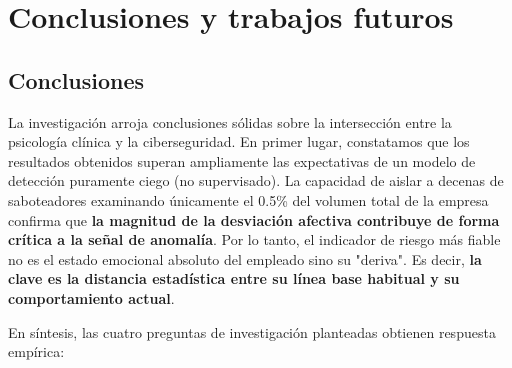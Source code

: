 \documentclass[IB]{TFUOC}%
\begin{document}


\chapter{Conclusiones y trabajos futuros}

\section{Conclusiones}
La investigación arroja conclusiones sólidas sobre la intersección entre la psicología clínica y la ciberseguridad. En primer lugar, constatamos que los resultados obtenidos superan ampliamente las expectativas de un modelo de detección puramente ciego (no supervisado). La capacidad de aislar a decenas de saboteadores examinando únicamente el 0.5\% del volumen total de la empresa confirma que \textbf{la magnitud de la desviación afectiva contribuye de forma crítica a la señal de anomalía}. Por lo tanto, el indicador de riesgo más fiable no es el estado emocional absoluto del empleado sino su "deriva". Es decir, \textbf{la clave es la distancia estadística entre su línea base habitual y su comportamiento actual}.

\medskip
\noindent En síntesis, las cuatro preguntas de investigación planteadas 
obtienen respuesta empírica:
\end{document}
